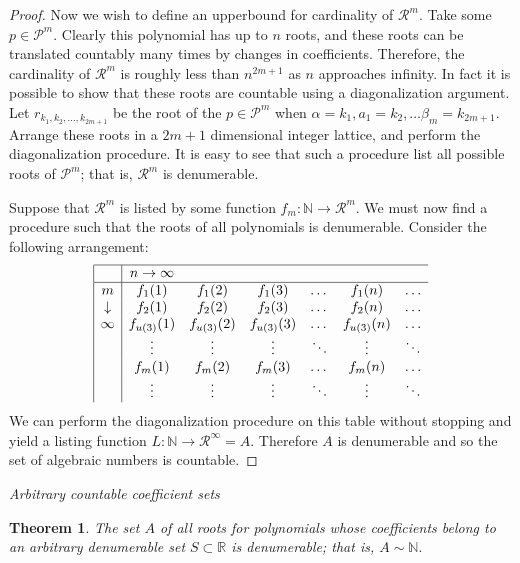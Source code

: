 \documentclass[letter]{article}
\newtheorem{theorem}{Theorem}
\newenvironment{menumerate}{%
  \edef\backupindent{\the\parindent}%
  \enumerate%
  \setlength{\parindent}{\backupindent}%
}{\endenumerate}
\begin{document}
\begin{menumerate}
\begin{menumerate}
\begin{proof}
	 		 			Now we wish to define an upperbound for cardinality of $\mathcal{R}^m$. Take some $p \in \mathcal{P}^m.$ Clearly this polynomial has up to $n$ roots, and these roots can be translated countably many times by changes in coefficients. Therefore, the cardinality of $\mathcal{R}^m$ is roughly less than $n^{2m+1}$ as $n$ approaches infinity. In fact it is possible to show that these roots are countable using a diagonalization argument. Let $r_{k_1,k_2,\dots,k_{2m+1}}$ be the root of the $p\in\mathcal{P}^m$ when $\alpha = k_1, a_1 = k_2,\dots \beta_m = k_{2m+1}.$ Arrange these roots in a $2m+1$ dimensional integer lattice, and perform the diagonalization procedure. It is easy to see that such a procedure list all possible roots of $\mathcal{P}^m$; that is, $\mathcal{R}^m$ is denumerable. 

	 		 			Suppose that $\mathcal{R}^m$ is listed by some function $f_m:\mathbb{N}\to \mathcal{R}^m$. We must now find a procedure such that the roots of all polynomials is denumerable. Consider the following arrangement:
	 		 			\begin{equation*}	
	 		 				\begin{array}{|c|cccccc}
	 		 					\hline
								  & n \to \infty & \\
								\hline
								 m & f_1(1) & f_1(2) & f_1(3) & \dots & f_1(n) &\dots \\
								 \downarrow  & f_2(1) & f_2(2) & f_2(3) & \dots   & f_2(n) &\dots  \\
								  \infty & f_{u(3)}(1) & f_{u(3)}(2) & f_{u(3)}(3) & \dots  & f_{u(3)}(n) & \dots   \\
								  & \vdots & \vdots & \vdots &\ddots & \vdots & \ddots \\
								  & f_m(1) & f_m(2) & f_m(3) & \dots & f_m(n) & \dots \\
								   & \vdots & \vdots & \vdots &\ddots & \vdots & \ddots \\
							\end{array}
	 		 			\end{equation*}
	 		 			We can perform the diagonalization procedure on this table without stopping and yield a listing function $L:\mathbb{N} \to \mathcal{R}^\infty = A.$ Therefore $A$ is denumerable and so the set of algebraic numbers is countable.
	 		 		\end{proof}

	 		 		\item \textit{Arbitrary countable coefficient sets}
	 		 		\begin{theorem}
	 		 			The set $A$ of all roots for polynomials whose coefficients belong to an arbitrary denumerable set $S \subset \mathbb{R}$ is denumerable; that is, $A \sim \mathbb{N}.$
	 		 		\end{theorem}


\end{menumerate}
\end{menumerate}
\end{document}
